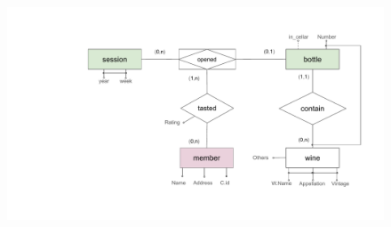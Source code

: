 \documentclass{beamer}
\begin{document}
\begin{frame}
    \begin{figure}
        \centering
        \includegraphics[width=1.1\linewidth]{tut_02_files/21.pdf}
    \end{figure}
\end{frame}
\end{document}
